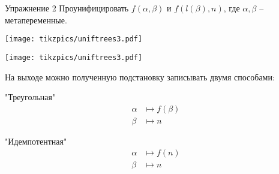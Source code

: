 \begin{frame}[fragile]{Упражнение 2}
Проунифицировать $f(\alpha,\beta)$ и $f(l(\beta), n)$, где $\alpha,\beta$ -- метапеременные.
\vspace{1em}

\begin{minipage}{0.45\linewidth}
  \begin{center}
\texttt{[image: tikzpics/uniftrees3.pdf]}
  \end{center}
\end{minipage}\hspace{1cm}
\begin{minipage}{0.45\linewidth}
  \begin{center}
\texttt{[image: tikzpics/uniftrees3.pdf]}
  \end{center}
\end{minipage}
\vspace{1em}\pause

На выходе можно полученную подстановку записывать двумя способами:\\

\begin{minipage}[t]{0.45\linewidth}
\begin{center}
"Треугольная"
\begin{align*}
  \alpha &\mapsto f(\beta)\\
  \beta &\mapsto n
\end{align*} 
\end{center}
\end{minipage}\hspace{1cm}
\begin{minipage}[t]{0.45\linewidth}
\begin{center}
"Идемпотентная"
\begin{align*}
  \alpha &\mapsto f(n)\\
  \beta &\mapsto n
\end{align*} 
\end{center}
\end{minipage}
\end{frame}


